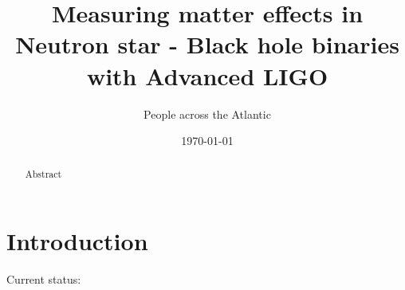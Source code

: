 \documentclass[aps,prd,amsmath,floats,floatfix, twocolumn,
superscriptaddress,nofootinbib,showpacs]{revtex4-1}
\begin{document}
\title{
Measuring matter effects in Neutron star - Black hole binaries with Advanced LIGO
}

\author{People across the Atlantic}

\date{\today}

\begin{abstract}
Abstract
\end{abstract}

\pacs{}

\maketitle

\section{Introduction}
Current status:
\end{document}
